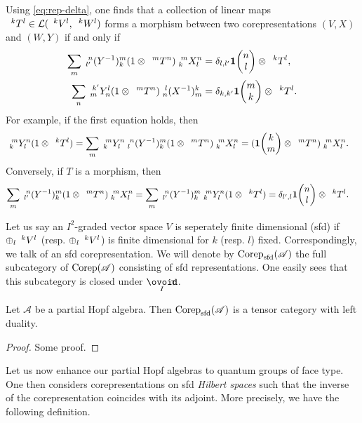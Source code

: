  \begin{Rem} %
 Using \eqref{eq:rep-delta}, one finds that a collection of linear maps $\Gru{T}{k}{l} \in
\mathcal{L}(\Gru{V}{k}{l},\Gru{W}{k}{l})$ forms a morphism between two corepresentations
$(V,X)$ and $(W,Y)$  if
and only if
  \begin{align} 
    \sum_{m} \Gr{(Y^{-1})}{n}{m}{l'}{k}(1 \otimes
    \Gru{T}{m}{n})\Gr{X}{m}{n}{k}{l} &= \delta_{l,l'}
    \UnitC{n}{l} \otimes \Gru{T}{k}{l}, \\
    \sum_{n} \Gr{Y}{k'}{l}{m}{n}(1 \otimes
    \Gru{T}{m}{n})\Gr{(X^{-1})}{l}{k}{n}{m} &= \delta_{k,k'}
    \UnitC{m}{k} \otimes \Gru{T}{k}{l}.
 \end{align}
For example, if the first equation holds, then
\begin{align*}
  \Gr{Y}{m}{n}{k}{l} (1 \otimes \Gru{T}{k}{l}) &=
  \sum_{m}  \Gr{Y}{m}{n}{k}{l} \Gr{(Y^{-1})}{n}{m}{l}{k}(1 \otimes
  \Gru{T}{m}{n})\Gr{X}{m}{n}{k}{l} = (\UnitC{k}{m}\otimes \Gru{T}{m}{n})\Gr{X}{m}{n}{k}{l}.
\end{align*}
Conversely, if $T$ is a morphism, then
\begin{align*}
  \sum_{m} \Gr{(Y^{-1})}{n}{m}{l'}{k}(1 \otimes
  \Gru{T}{m}{n})\Gr{X}{m}{n}{k}{l} &= \sum_{m}
  \Gr{(Y^{-1})}{n}{m}{l'}{k} \Gr{Y}{m}{n}{k}{l}(1 \otimes
  \Gru{T}{k}{l}) = \delta_{l',l} \UnitC{n}{l} \otimes
  \Gru{T}{k}{l}.
\end{align*}
\end{Rem}

Let us say an $I^2$-graded vector space $V$ is seperately finite dimensional (sfd) if $\oplus_l \Gru{V}{k}{l}$ (resp. $\oplus_l \Gru{V}{k}{l}$) is finite dimensional for $k$ (resp. $l$) fixed. Correspondingly, we talk of an sfd corepresentation. We will denote by $\Corep_{\sfd}(\mathscr{A})$ the full subcategory of $\Corep(\mathscr{A})$ consisting of sfd representations. One easily sees that this subcategory is closed under $\Circt$. 

\begin{Lem} Let $\mathscr{A}$ be a partial Hopf algebra. Then $\Corep_{\sfd}(\mathscr{A})$ is a tensor category with left duality. 
\end{Lem} 

\begin{proof} Some proof.
\end{proof}

Let us now enhance our partial Hopf algebras to quantum groups of face type. One then considers corepresentations on sfd \emph{Hilbert spaces} such that the inverse of the corepresentation coincides with its adjoint. More precisely, we have the following definition.


